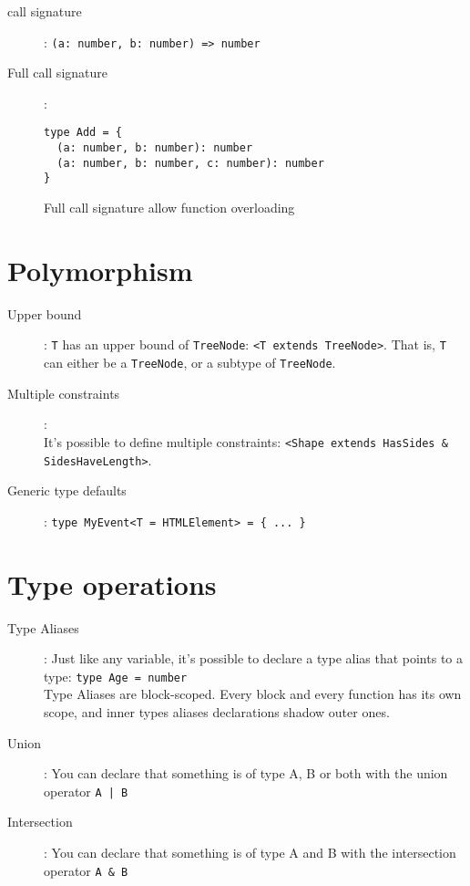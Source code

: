 \documentclass[french]{article}
\begin{document}
\begin{description}
  \item[call signature]: \lstinline{(a: number, b: number) => number}
  \item[Full call signature]:
    \begin{lstlisting}
type Add = {
  (a: number, b: number): number
  (a: number, b: number, c: number): number
}
    \end{lstlisting}
    Full call signature allow function overloading
\end{description}

\section{Polymorphism}

\begin{description}
  \item[Upper bound]: \lstinline{T} has an upper bound of \lstinline{TreeNode}: \lstinline{<T extends TreeNode>}. That is, \lstinline{T} can either be a \lstinline{TreeNode}, or a subtype of \lstinline{TreeNode}.
  \item[Multiple constraints]:\\ It's possible to define multiple constraints: \lstinline{<Shape extends HasSides & SidesHaveLength>}.
  \item[Generic type defaults]: \lstinline|type MyEvent<T = HTMLElement> = { ... }|
\end{description}

\section{Type operations}

\begin{description}
  \item[Type Aliases]: Just like any variable, it's possible to declare a type alias that points to a type: \lstinline{type Age = number} \\
    Type Aliases are block-scoped. Every block and every function has its own scope, and inner types aliases declarations shadow outer ones.
  \item[Union]: You can declare that something is of type A, B or both with the union operator \lstinline{A | B} 
  \item[Intersection]: You can declare that something is of type A and B with the intersection operator \lstinline{A & B} 
\end{description}
\end{document}
